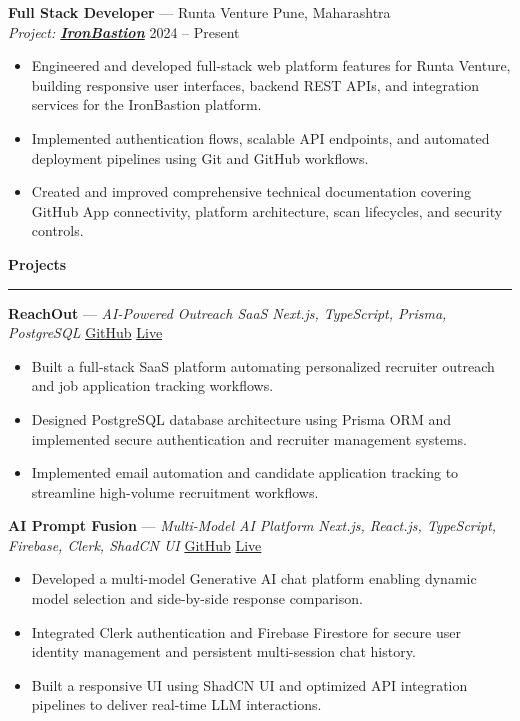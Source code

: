 \documentclass[10pt,a4paper]{article}
\newcommand{\cvsection}[1]{%
  \vspace{5pt}%
  {\large\bfseries\color{primarycolor} #1}%
  \vspace{1.5pt}\hrule\vspace{3.5pt}%
}
\begin{document}
\textbf{Full Stack Developer} --- Runta Venture \hfill Pune, Maharashtra\\
\textnormal{\textit{Project: \href{http://13.232.3.52/}{\textbf{IronBastion}}}} \hfill 2024 -- Present
\begin{itemize}
    \item Engineered and developed full-stack web platform features for Runta Venture, building responsive user interfaces, backend REST APIs, and integration services for the IronBastion platform.
    \item Implemented authentication flows, scalable API endpoints, and automated deployment pipelines using Git and GitHub workflows.
    \item Created and improved comprehensive technical documentation covering GitHub App connectivity, platform architecture, scan lifecycles, and security controls.
\end{itemize}

\cvsection{Projects}

\textbf{ReachOut} --- \textnormal{\textit{AI-Powered Outreach SaaS}} \;\textbar\; \textit{Next.js, TypeScript, Prisma, PostgreSQL} \hfill \href{https://github.com/Varad163/ReachOut}{GitHub} \;\textbar\; \href{https://varad163-reachoutai.vercel.app/}{Live}
\begin{itemize}
    \item Built a full-stack SaaS platform automating personalized recruiter outreach and job application tracking workflows.
    \item Designed PostgreSQL database architecture using Prisma ORM and implemented secure authentication and recruiter management systems.
    \item Implemented email automation and candidate application tracking to streamline high-volume recruitment workflows.
\end{itemize}

\vspace{4pt}

\textbf{AI Prompt Fusion} --- \textnormal{\textit{Multi-Model AI Platform}} \;\textbar\; \textit{Next.js, React.js, TypeScript, Firebase, Clerk, ShadCN UI} \hfill \href{https://github.com/Varad163/Ai-PromptFusion}{GitHub} \;\textbar\; \href{https://ai-prompt-fusion.vercel.app/}{Live}
\begin{itemize}
    \item Developed a multi-model Generative AI chat platform enabling dynamic model selection and side-by-side response comparison.
    \item Integrated Clerk authentication and Firebase Firestore for secure user identity management and persistent multi-session chat history.
    \item Built a responsive UI using ShadCN UI and optimized API integration pipelines to deliver real-time LLM interactions.
\end{itemize}
\end{document}
